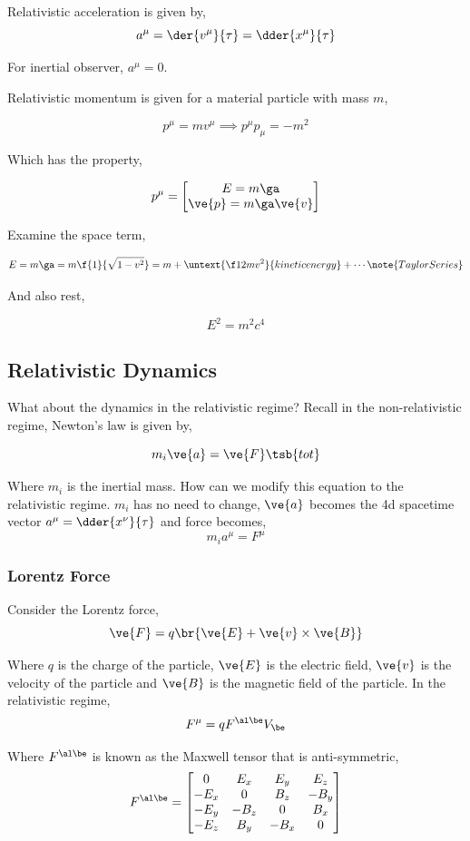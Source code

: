 \documentclass{article}
\newcommand{\mtrx}[1]{
    \begin{bmatrix}
    #1
    \end{bmatrix}
}
\begin{document}
Relativistic acceleration is given by,
\[ a^\mu = \der{v^\mu}{\tau} = \dder{x^\mu}{\tau} \]

For inertial observer, $a^\mu = 0$.

Relativistic momentum is given for a material particle with mass $m$,

\[ p^\mu = m v^\mu \implies p^\mu p_\mu = - m^2\]

Which has the property,

\[ p^\mu = \mtrx{E = m \ga \\ \ve{p} = m\ga \ve{v}} \]

Examine the space term,

\[ E = m \ga = m \f{1}{\sqrt{1-v^2}} = m + \untext{\f12 m v^2}{kinetic energy} + \cdots \note{Taylor Series} \]

And also rest,

\[ E^2 = m^2 c^4 \]

\subsection{Relativistic Dynamics}

What about the dynamics in the relativistic regime? Recall in the non-relativistic regime, Newton's law is given by,

\[ m_i \ve{a} = \ve{F}\tsb{tot} \]

Where $m_i$ is the inertial mass. How can we modify this equation to the relativistic regime. $m_i$ has no need to change, $\ve{a}$ becomes the 4d spacetime vector $a^\mu = \dder{x^\nu}{\tau}$ and force becomes,
\[ m_i a^\mu = F^\mu \]

\subsubsection{Lorentz Force}

Consider the Lorentz force,
\[ \ve{F} = q \br{\ve{E} + \ve{v} \times \ve{B}} \]

Where $q$ is the charge of the particle, $\ve{E}$ is the electric field, $\ve{v}$ is the velocity of the particle and $\ve{B}$ is the magnetic field of the particle. In the relativistic regime,
\[ F^\mu = q {F^{\al\be}} V_\be \]

Where $F^{\al\be}$ is known as the Maxwell tensor that is anti-symmetric,
\[ F^{\al\be} = \mtrx{0 & E_x & E_y & E_z \\ -E_x & 0 & B_z & -B_y \\ -E_y & -B_z & 0 & B_x \\ -E_z & B_y & -B_x & 0} \]
\end{document}
